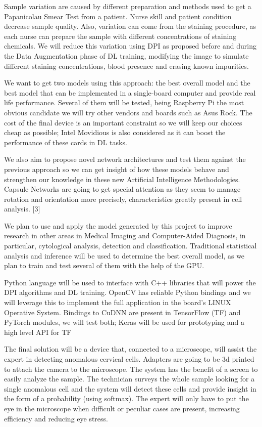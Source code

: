Sample variation are caused by different preparation and methods used to get a
Papanicolau Smear Test from a patient. Nurse skill and patient condition
decrease sample quality. Also, variation can come from the staining procedure,
as each nurse can prepare the sample with different concentrations of staining
chemicals. We will reduce this variation using DPI as proposed before and during
the Data Augmentation phase of DL training, modifying the image to simulate
different staining concentrations, blood presence and erasing known impurities. 

We want to get two models using this approach: the best overall model and the
best model that can be implemented in a single-board computer and provide real
life performance. Several of them will be tested, being Raspberry Pi the most
obvious candidate we will try other vendors and boards such as Asus Rock. The
cost of the final device is an important constraint so we will keep our choices
cheap as possible; Intel Movidious is also considered as it can boost the
performance of these cards in DL tasks.

We also aim to propose novel network architectures and test them against the
previous approach so we can get insight of how these models behave and
strengthen our knowledge in these new Artificial Intelligence Methodologies.
Capsule Networks are going to get special attention as they seem to manage
rotation and orientation more precisely, characteristics greatly present in cell
analysis. [3]

We plan to use and apply the model generated by this project to improve research
in other areas in Medical Imaging and Computer-Aided Diagnosis, in particular,
cytological analysis, detection and classification. Traditional statistical
analysis and inference will be used to determine the best overall model, as we
plan to train and test several of them with the help of the GPU. 

Python language will be used to interface with C++ libraries that will power the
DPI algorithms and DL training. OpenCV has reliable Python bindings and we will
leverage this to implement the full application in the board’s LINUX Operative
System. Bindings to CuDNN are present in TensorFlow (TF) and PyTorch modules, we
will test both; Keras will be used for prototyping and a high level API for TF 

The final solution will be a device that, connected to a microscope, will assist
the expert in detecting anomalous cervical cells. Adapters are going to be 3d
printed to attach the camera to the microscope. The system has the benefit of a
screen to easily analyze the sample. The technician surveys the whole sample
looking for a single anomalous cell and the system will detect these cells and
provide insight in the form of a probability (using softmax). The expert will
only have to put the eye in the microscope when difficult or peculiar cases are
present, increasing efficiency and reducing eye stress.


